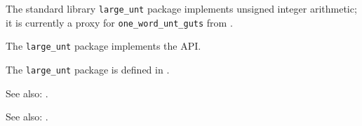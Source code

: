 
The standard library {\tt large\_unt} package implements 
unsigned integer arithmetic;  it is currently a proxy for 
{\tt one\_word\_unt\_guts} from .

The {\tt large\_unt} package implements the  API.

The {\tt large\_unt} package is defined in .

See also:  .

See also:  .


